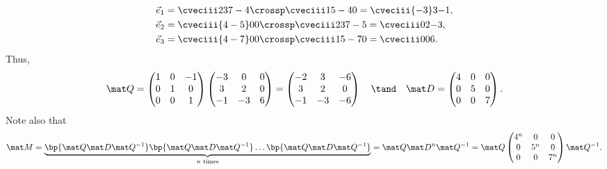 \begin{solution}
\begin{ppart}
        \begin{align*}
            \vec e_1 &= \cveciii23{7-4} \crossp \cveciii1{5-4}0 = \cveciii{-3}3{-1},\\
            \vec e_2 &= \cveciii{4-5}00 \crossp \cveciii23{7-5} = \cveciii02{-3},\\
            \vec e_3 &= \cveciii{4-7}00 \crossp \cveciii1{5-7}0 = \cveciii006.
        \end{align*}
        Thus, \[\mat Q = \begin{pmatrix}1 & 0 & -1 \\ 0 & 1 & 0 \\ 0 & 0 & 1\end{pmatrix} \begin{pmatrix}-3 & 0 & 0 \\ 3 & 2 & 0 \\ -1 & -3 & 6\end{pmatrix} = \begin{pmatrix}-2 & 3 & -6 \\ 3 & 2 & 0 \\ -1 & -3 & -6\end{pmatrix} \quad \tand \quad \mat D = \begin{pmatrix}4 & 0 & 0 \\ 0 & 5 & 0 \\ 0 & 0 & 7\end{pmatrix}.\] Note also that \[\mat M = \underbrace{\bp{\mat Q \mat D \mat Q^{-1}} \bp{\mat Q \mat D \mat Q^{-1}} \dots \bp{\mat Q \mat D \mat Q^{-1}}}_{\text{$n$ times}} = \mat Q \mat D^n \mat Q^{-1} = \mat Q \begin{pmatrix}4^n & 0 & 0 \\ 0 & 5^n & 0 \\ 0 & 0 & 7^n\end{pmatrix} \mat Q^{-1}.\]
    \end{ppart}
\end{solution}

